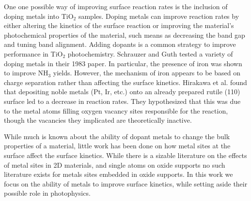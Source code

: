 \documentclass[catalysts,article,submit,moreauthors,pdftex,10pt,a4paper]{mdpi}
\theoremstyle{mdpi}
\newcounter{ex}
\newcounter{re}
\theoremstyle{mdpidefinition}
\begin{document}
One one possible way of improving surface reaction rates is the inclusion of doping metals into TiO$_2$ samples. Doping metals can improve reaction rates by either altering the kinetics of the surface reaction or improving the material's photochemical properties of the material, such means as decreasing the band gap and tuning band alignment. Adding dopants is a common strategy to improve performance in TiO$_2$ photochemistry.\cite{Schneider_2014, Li_2007, Dozzi_2013} Schrauzer and Guth tested a variety of doping metals in their 1983 paper.\cite{Schrauzer_1983} In particular, the presence of iron was shown to improve NH$_3$ yields\cite{Schrauzer_1977,Augugliaro_1982}. However, the mechanism of iron appears to be based on charge separation rather than affecting the surface kinetics.\cite{Comer_2018} Hirakawa et al. found that depositing noble metals (Pt, Ir, etc.) onto an already prepared rutile (110) surface led to a decrease in reaction rates.\cite{Hirakawa_2017} They hypothesized that this was due to the metal atoms filling oxygen vacancy sites responsible for the reaction, though the vacancies they implicated are theoretically inactive.\cite{Comer_2018} 

While much is known about the ability of dopant metals to change the bulk properties of a material, little work has been done on how metal sites at the surface affect the surface kinetics. While there is a sizable literature on the effects of metal sites in 2D materials\cite{Khan_2018}, and single atoms on oxide supports\cite{Liu_2016} no such literature exists for metals sites embedded in oxide supports. In this work we focus on the ability of metals to improve surface kinetics, while setting aside their possible role in photophysics.


\end{document}

